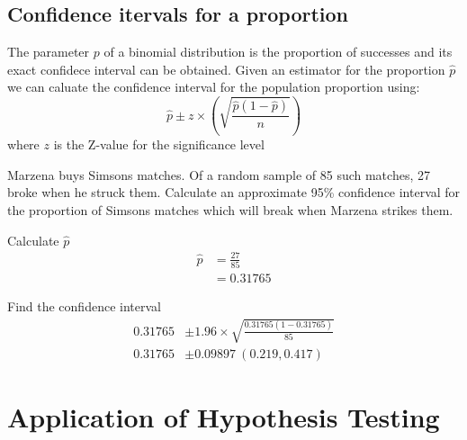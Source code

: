     \newpage
    \subsection{Confidence itervals for a proportion}
        The parameter $p$ of a binomial distribution is the proportion of successes and its exact confidece interval can be obtained. Given an estimator for the proportion $\hat{p}$ we can caluate the confidence interval for the population proportion using: 
        $$\hat{p} \pm z \times \left(\sqrt{\frac{\hat{p}(1-\hat{p})}{n}}\right)$$ 
        where $z$ is the Z-value for the significance level

        \begin{example}
        {
            Marzena buys Simsons matches. Of a random sample of 85 such matches, 27 broke when he struck them. Calculate an approximate 95\% confidence interval for the proportion of Simsons matches which will break when Marzena strikes them.
        }

        \begin{step}{Calculate $\hat{p}$}
        \begin{align*}
        \hat{p} &= \frac{27}{85} \\
                &= 0.31765
        \end{align*}
        \end{step}

        \begin{step}{Find the confidence interval}
        \begin{align*}
        0.31765 &\pm 1.96 \times \sqrt{\frac{0.31765(1-0.31765)}{85}} \\ 
        0.31765 &\pm 0.09897\ (0.219, 0.417) 
        \end{align*}
        \end{step}

        \end{example}

\newpage
\section{Application of Hypothesis Testing}